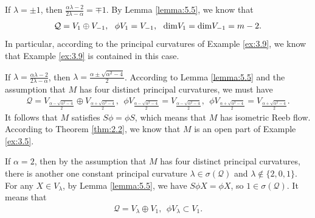 \documentclass[reqno]{amsart}%
\theoremstyle{definition}
\numberwithin{equation}{section}
\begin{document}
If $\lambda=\pm1$, then $\frac{\alpha\lambda-2}{2\lambda-\alpha}=\mp1$.
By Lemma \ref{lemma:5.5}, we know that
$$
\begin{aligned}
\mathcal{Q}=V_1\oplus V_{-1}, \ \ \phi V_1= V_{-1},\ \ {\rm dim}V_1={\rm dim}V_{-1}=m-2.
\end{aligned}
$$
In particular, according to the principal curvatures of
Example \ref{ex:3.9}, we know that Example \ref{ex:3.9} is contained in this case.

If $\lambda=\frac{\alpha\lambda-2}{2\lambda-\alpha}$, then $\lambda=\frac{\alpha\pm\sqrt{\alpha^2-4}}{2}$.
According to Lemma \ref{lemma:5.5} and the assumption that $M$ has
four distinct principal curvatures, we must have
$$
\begin{aligned}
\mathcal{Q}=V_{\frac{\alpha-\sqrt{\alpha^2-4}}{2}}\oplus V_{\frac{\alpha+\sqrt{\alpha^2-4}}{2}}, \ \ \phi V_{\frac{\alpha-\sqrt{\alpha^2-4}}{2}}=V_{\frac{\alpha-\sqrt{\alpha^2-4}}{2}},\ \ \phi V_{\frac{\alpha+\sqrt{\alpha^2-4}}{2}}=V_{\frac{\alpha+\sqrt{\alpha^2-4}}{2}}.
\end{aligned}
$$
It follows that $M$ satisfies $S\phi=\phi S$, which means that $M$ has isometric Reeb flow.
According to Theorem \ref{thm:2.2}, we know that $M$ is an open part of Example \ref{ex:3.5}.

If $\alpha=2$, then by the assumption that $M$ has four distinct principal curvatures,
there is another one constant principal curvature $\lambda\in\sigma(\mathcal{Q})$ and
$\lambda\notin\{2,0,1\}$. For any $X\in V_\lambda$, by Lemma \ref{lemma:5.5},
we have $S\phi X=\phi X$, so $1\in\sigma(\mathcal{Q})$.
It means that
$$
\begin{aligned}
\mathcal{Q}=V_\lambda\oplus V_1, \ \ \phi V_\lambda\subset V_1.
\end{aligned}
$$
\end{document}
